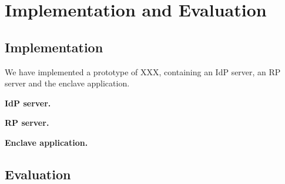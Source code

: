 \section{Implementation and Evaluation}
\subsection{Implementation}
We have implemented  a prototype of XXX, containing an IdP server, an RP server and the enclave application.

\noindent\textbf{IdP server.}

\noindent\textbf{RP server.}

\noindent\textbf{Enclave application.}

\subsection{Evaluation}